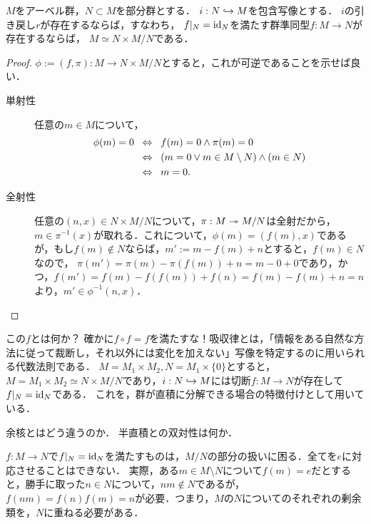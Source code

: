 \documentclass[uplatex,dvipdfmx]{jsreport}
\begin{document}
\begin{lemma}\label{lemma-decomposition-by-projector}
    $M$をアーベル群，$N\subset M$を部分群とする．
    $i:N\hookrightarrow M$を包含写像とする．
    $i$の引き戻し$r$が存在するならば，すなわち，
    $f|_N=\mathrm{id}_N$を満たす群準同型$f:M\to N$が存在するならば，
    $M\simeq N\times M/N$である．
\end{lemma}
\begin{proof}
    $\phi:=(f,\pi):M\to N\times M/N$とすると，これが可逆であることを示せば良い．
    \begin{description}
        \item[単射性] 任意の$m\in M$について， \begin{align*}
            \phi(m)=0&\;\;\Leftrightarrow\;\; f(m)=0\land \pi(m)=0\\
            &\;\;\Leftrightarrow\;\; (m=0\lor m\in M\setminus N)\land(m\in N)\\
            &\;\;\Leftrightarrow\;\; m=0.
        \end{align*}
        \item[全射性]
        任意の$(n,x)\in N\times M/N$について，$\pi:M\twoheadrightarrow M/N$は全射だから，
        $m\in\pi^{-1}(x)$が取れる．これについて，$\phi(m)=(f(m),x)$であるが，もし$f(m)\notin N$ならば，$m':=m-f(m)+n$とすると，$f(m)\in N$なので，
        $\pi(m')=\pi(m)-\pi(f(m))+n=m-0+0$であり，かつ，$f(m')=f(m)-f(f(m))+f(n)=f(m)-f(m)+n=n$より，$m'\in \phi^{-1}(n,x)$．
    \end{description}
\end{proof}
\begin{remarks}[射影子の一般化]
    この$f$とは何か？
    確かに$f\circ f=f$を満たすな！吸収律とは，「情報をある自然な方法に従って裁断し，それ以外には変化を加えない」写像を特定するのに用いられる代数法則である．
    $M=M_1\times M_2,N=M_1\times\{0\}$とすると，$M=M_1\times M_2\simeq N\times M/N$であり，$i:N\hookrightarrow M$には切断$f:M\to N$が存在して$f|_N=\mathrm{id}_N$である．
    これを，群が直積に分解できる場合の特徴付けとして用いている．

    余核とはどう違うのか．
    半直積との双対性は何か．
\end{remarks}
\begin{remarks}[直観]
    $f:M\to N$で$f|_N=\mathrm{id}_N$を満たすものは，$M/N$の部分の扱いに困る．全てを$e$に対応させることはできない．
    実際，ある$m\in M\setminus N$について$f(m)=e$だとすると，勝手に取った$n\in N$について，$nm\notin N$であるが，$f(nm)=f(n)f(m)=n$が必要．つまり，$M$の$N$についてのそれぞれの剰余類を，$N$に重ねる必要がある．
\end{remarks}
\end{document}
